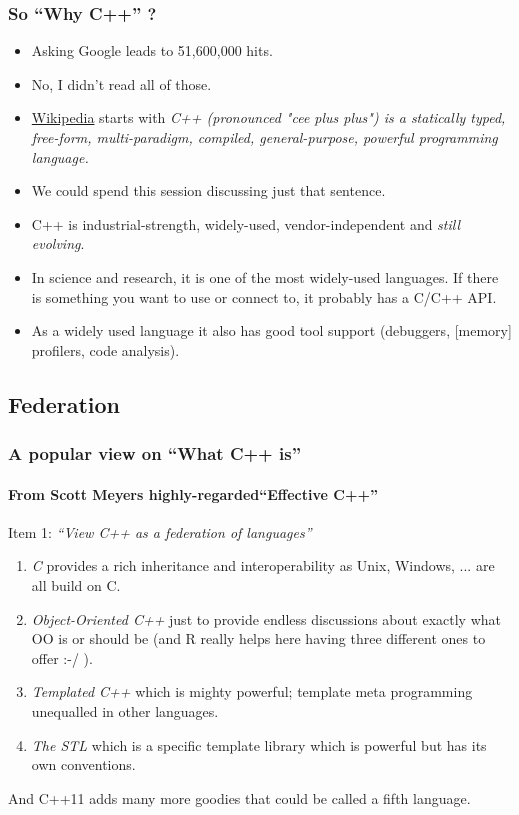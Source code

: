 \documentclass[dvipsnames,compress,pdflatex,beamer]{beamer}
\begin{document}
\begin{frame}
  \frametitle{So ``Why C++'' ?}

  \pause
  \begin{itemize}[<+->]
  \item Asking Google leads to 51,600,000 hits. 
  \item No, I didn't read all of those.
  \item \href{http://en.wikipedia.org/wiki/C\%2B\%2B}{Wikipedia} starts with
    \emph{C++ (pronounced "cee plus plus") is a statically typed,
      free-form, multi-paradigm, compiled, general-purpose, powerful
      programming language.}  
  \item We could spend this session discussing just that sentence.
  \item C++ is industrial-strength, widely-used, vendor-independent and
    \emph{still evolving}.
  \item In science and research, it is one of the most widely-used
    languages.  If there is something you want to use or connect to, it
    probably has a C/C++ API.
  \item As a widely used language it also has good tool support (debuggers,
    [memory] profilers, code analysis).
  \end{itemize}
\end{frame}

\subsection{Federation}
\begin{frame}
  \frametitle{A popular view on ``What C++ is''}
  \framesubtitle{From Scott Meyers highly-regarded``Effective C++''}

  \pause

  Item 1:   \emph{``View C++ as a federation of languages''}

  \pause

  \begin{enumerate}[<+->]
  \item \emph{C} provides a rich inheritance and interoperability as Unix, Windows,
    ... are all build on C.
  \item \emph{Object-Oriented C++} just to provide endless discussions about
    exactly what OO is or should be (and R really helps here having
    three different ones to offer :-/ ).
  \item \emph{Templated C++} which is mighty powerful; template meta
    programming unequalled in other languages.
  \item \emph{The STL} which is a specific template library which is powerful but
    has its own conventions.
  \end{enumerate}
  
  \pause And C++11 adds many more goodies that could be called a fifth language.
\end{frame}
\end{document}
